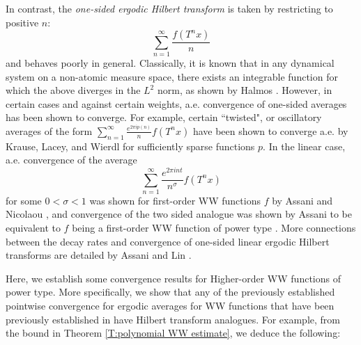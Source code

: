 \documentclass[11pt, oneside]{amsart}   	%
\newcommand{\1}{\mathbbm{1}}
\theoremstyle{definition}
\begin{document}
In contrast, the \textit{one-sided ergodic Hilbert transform} is taken by restricting to positive $n$:
$$\sum_{n=1}^\infty  \frac{f(T^n x)}{n}$$
and behaves poorly in general. Classically, it is known that in any dynamical system on a non-atomic measure space, there exists an integrable function for which the above diverges in the $L^2$ norm, as shown by Halmos \cite{Halmos}. However, in certain cases and against certain weights, a.e. convergence of one-sided averages has been shown to converge. For example, certain ``twisted", or oscillatory averages of the form
$\sum_{n=1}^\infty \frac{e^{2\pi i p(n)}}{n} f(T^nx)$
have been shown to converge a.e. by Krause, Lacey, and Wierdl \cite{Krause2016OnCO} for sufficiently sparse functions $p$. In the linear case, a.e. convergence of the average 
$$\sum_{n=1}^\infty \frac{e^{2\pi i n t}}{n^\sigma} f(T^n x)$$
for some $0 < \sigma < 1$ was shown for first-order WW functions $f$ by Assani and Nicolaou \cite{AssaniNicolaou}, and convergence of the two sided analogue was shown by Assani to be equivalent to $f$ being a first-order WW function of power type \cite{assani04}. More connections between the decay rates and convergence of one-sided linear ergodic Hilbert transforms are detailed by Assani and Lin \cite{AssaniLin}.




Here, we establish some convergence results for Higher-order WW functions of power type. More specifically, we show that any of the previously established pointwise convergence for ergodic averages for WW functions that have been previously established in \cite{assani2024higherorderwienerwintnersystems} have Hilbert transform analogues. For example, from the bound in Theorem \ref{T:polynomial WW estimate}, we deduce the following:
\end{document}
